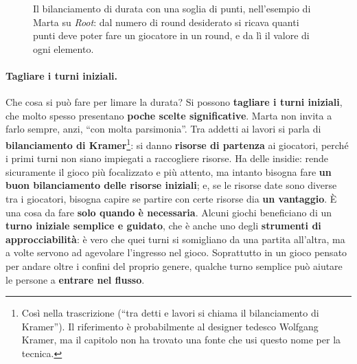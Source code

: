 \begin{figure}[htbp]
\centering
{}
\caption{Il bilanciamento di durata con una soglia di punti, nell'esempio di Marta su
\emph{Root}: dal numero di round desiderato si ricava quanti punti deve poter fare un
giocatore in un round, e da lì il valore di ogni elemento.}
\label{a14:fig:durata}
\end{figure}

\paragraph{Tagliare i turni iniziali.} Che cosa si può fare per limare la durata? Si possono
\textbf{tagliare i turni iniziali}, che molto spesso presentano \textbf{poche scelte
significative}. Marta non invita a farlo sempre, anzi, ``con molta parsimonia''. Tra addetti
ai lavori si parla di \textbf{bilanciamento di Kramer}\footnote{Così nella trascrizione (``tra
detti e lavori si chiama il bilanciamento di Kramer''). Il riferimento è probabilmente al
designer tedesco Wolfgang Kramer, ma il capitolo non ha trovato una fonte che usi questo nome
per la tecnica.}: si danno \textbf{risorse di partenza} ai giocatori, perché i primi turni non
siano impiegati a raccogliere risorse. Ha delle insidie: rende sicuramente il gioco più
focalizzato e più attento, ma intanto bisogna fare \textbf{un buon bilanciamento delle risorse
iniziali}; e, se le risorse date sono diverse tra i giocatori, bisogna capire se partire con
certe risorse dia \textbf{un vantaggio}. È una cosa da fare \textbf{solo quando è necessaria}.
Alcuni giochi beneficiano di un \textbf{turno iniziale semplice e guidato}, che è anche uno
degli \textbf{strumenti di approcciabilità}: è vero che quei turni si somigliano da una partita
all'altra, ma a volte servono ad agevolare l'ingresso nel gioco. Soprattutto in un gioco
pensato per andare oltre i confini del proprio genere, qualche turno semplice può aiutare le
persone a \textbf{entrare nel flusso}.

